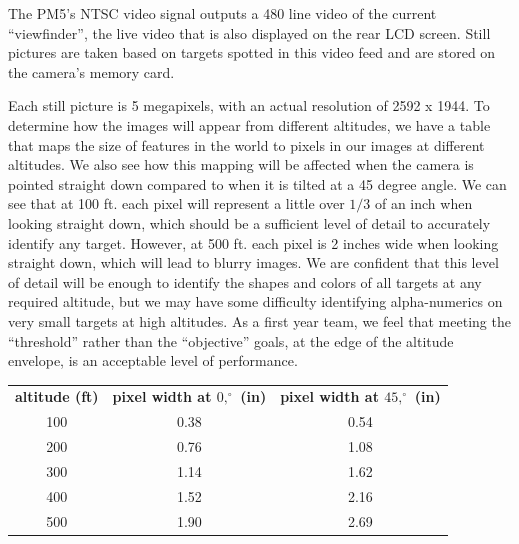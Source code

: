 \documentclass[10pt]{report}
\begin{document}

The PM5's NTSC video signal outputs a 480 line video of the current ``viewfinder'', the live video that is also displayed on the rear LCD screen. 
Still pictures are taken based on targets spotted in this video feed and are stored on the camera's memory card.

Each still picture is 5 megapixels, with an actual resolution of 2592 x 1944.  To determine how the images will appear from different altitudes, we have a table that maps the size of features in the world to pixels in our images at different altitudes.  We also see how this mapping will be affected when the camera is pointed straight down compared to when it is tilted at a 45 degree angle.  We can see that at 100 ft. each pixel will represent a little over $1/3$ of an inch when looking straight down, which should be a sufficient level of detail to accurately identify any target.  However, at 500 ft. each pixel is 2 inches wide when looking straight down, which will lead to blurry images.  We are confident that this level of detail will be enough to identify the shapes and colors of all targets at any required altitude, but we may have some difficulty identifying alpha-numerics on very small targets at high altitudes.  As a first year team, we feel that meeting the ``threshold'' rather than the ``objective'' goals, at the edge of the altitude envelope, is an acceptable level of performance.

\begin{tabular}{ccc}
\\{\bf altitude (ft)} & {\bf pixel width at $0,^{\circ}$ (in)} & {\bf pixel width at $45,^{\circ}$ (in)} \\
       100 &       0.38 &       0.54 \\
       200 &       0.76 &       1.08 \\
       300 &       1.14 &       1.62 \\
       400 &       1.52 &       2.16 \\
       500 &       1.90 &       2.69 \\
\end{tabular}

\end{document}
